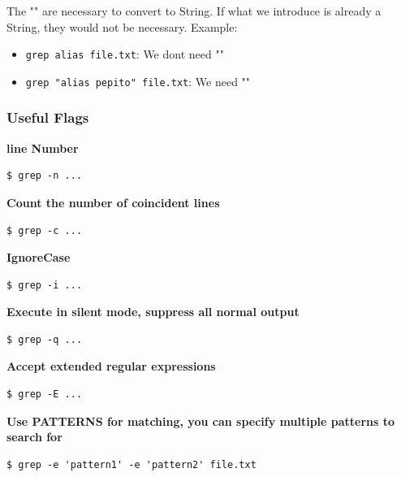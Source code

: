\documentclass{article}
\newenvironment{blocktemplateII}[1]{%
    \tcolorbox[beamer,%
    noparskip,breakable,
    colframe=Green,%
    colbacklower=LimeGreen!75!LightGreen,%
    title=#1]}%
    {\endtcolorbox}
\newenvironment{codetemplate}[1][]{%
  \mybasecolorbox[#1]
  \itshape
}{%
  \endmybasecolorbox
}
\begin{document}
\begin{blocktemplateII}{Note}
    The "" are necessary to convert to String. If what we introduce is already a String, they would not be necessary. Example:
\begin{itemize}
    \item \verb|grep alias file.txt|: We dont need ""
    \item \verb|grep "alias pepito" file.txt|: We need ""
\end{itemize}
\end{blocktemplateII}

\subsubsection{Useful Flags}

\textbf{line Number}
\begin{codetemplate}{}
\begin{verbatim}
$ grep -n ...
\end{verbatim}
\end{codetemplate}

\textbf{Count the number of coincident lines}
\begin{codetemplate}{}
\begin{verbatim}
$ grep -c ...
\end{verbatim}
\end{codetemplate}

\textbf{IgnoreCase}
\begin{codetemplate}{}
\begin{verbatim}
$ grep -i ...
\end{verbatim}
\end{codetemplate}

\textbf{Execute in silent mode, suppress all normal output}
\begin{codetemplate}{}
\begin{verbatim}
$ grep -q ...
\end{verbatim}
\end{codetemplate}

\textbf{Accept extended regular expressions}
\begin{codetemplate}{}
\begin{verbatim}
$ grep -E ...
\end{verbatim}
\end{codetemplate}

\textbf{Use PATTERNS for matching, you can specify multiple patterns to search for}
\begin{codetemplate}{}
\begin{verbatim}
$ grep -e 'pattern1' -e 'pattern2' file.txt
\end{verbatim}
\end{codetemplate}
\end{document}
